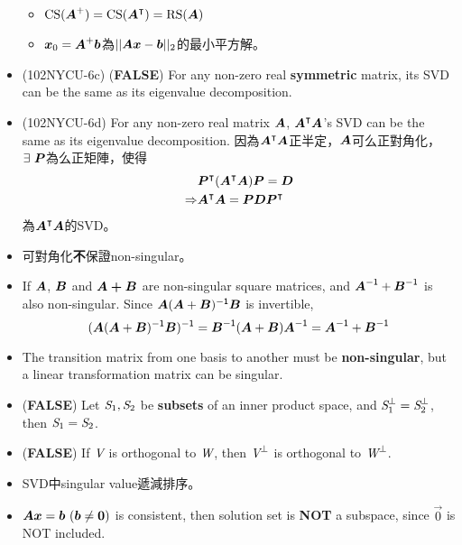 \begin{itemize}
\begin{itemize}
		\item $\operatorname{CS}(\boldsymbol{A}^+) = \operatorname{CS}(\boldsymbol{A}^\intercal) = \operatorname{RS}(\boldsymbol{A})$
		\item $\boldsymbol{x}_0 = \boldsymbol{A}^+ \boldsymbol{b}$為$||\boldsymbol{A}\boldsymbol{x} - \boldsymbol{b}||_2$的最小平方解。
    \end{itemize}
    \item (102NYCU-6c) (\textbf{FALSE}) For any non-zero real \textbf{symmetric} matrix, its SVD can be the same as its eigenvalue decomposition.
    \item (102NYCU-6d) For any non-zero real matrix $\boldsymbol{A}$, $\boldsymbol{A}^\intercal\boldsymbol{A}$'s SVD can be the same as its eigenvalue decomposition. 
    因為$\boldsymbol{A}^\intercal\boldsymbol{A}$正半定，$\boldsymbol{A}$可么正對角化，$\exists \ \boldsymbol{P}$為么正矩陣，使得 \begin{equation}
        \begin{aligned}
            & \boldsymbol{P}^\intercal(\boldsymbol{A}^\intercal\boldsymbol{A})\boldsymbol{P} = \boldsymbol{D} \\
            \Rightarrow & \boldsymbol{A}^\intercal\boldsymbol{A} = \boldsymbol{P}\boldsymbol{D}\boldsymbol{P}^\intercal
        \end{aligned} 
    \end{equation} 為$\boldsymbol{A}^\intercal\boldsymbol{A}$的SVD。
    \item 可對角化\textbf{不}保證non-singular。
    \item If $\boldsymbol{A}$, $\boldsymbol{B}$ and $\boldsymbol{A + B}$ are non-singular square matrices, and $\boldsymbol{A}^{\mathsf{-1}} + \boldsymbol{B}^{\mathsf{-1}}$ is also non-singular.
    Since $\boldsymbol{A}(\boldsymbol{A} + \boldsymbol{B})^{\mathsf{-1}}\boldsymbol{B}$ is invertible, \begin{equation}
        (\boldsymbol{A}(\boldsymbol{A} + \boldsymbol{B})^{\mathsf{-1}}\boldsymbol{B})^{\mathsf{-1}} = \boldsymbol{B}^{\mathsf{-1}}(\boldsymbol{A} + \boldsymbol{B})\boldsymbol{A}^{\mathsf{-1}} = \boldsymbol{A}^{\mathsf{-1}} + \boldsymbol{B}^{\mathsf{-1}}
    \end{equation}
    \item The transition matrix from one basis to another must be \textbf{non-singular}, but a linear transformation matrix can be singular.
    \item (\textbf{FALSE}) Let $\textit{S}_1, \textit{S}_2$ be \textbf{subsets} of an inner product space, and $\textit{S}_1^{\bot} = \textit{S}_2^{\bot}$, then $\textit{S}_1 = \textit{S}_2$.
    \item (\textbf{FALSE}) If $\textit{V}$ is orthogonal to $\textit{W}$, then $\textit{V}^\bot$ is orthogonal to $\textit{W}^\bot$.
    \item SVD中singular value遞減排序。
    \item $\boldsymbol{A}\boldsymbol{x} = \boldsymbol{b} \ (\boldsymbol{b} \neq \boldsymbol{0})$ is consistent, then solution set is \textbf{NOT} a subspace, since $\vec{0}$ is NOT included.

\end{itemize}
